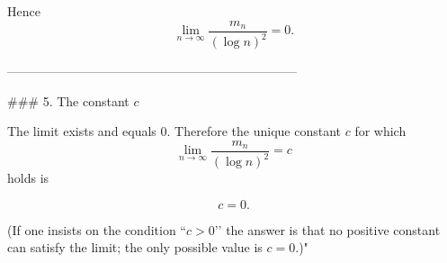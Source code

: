 \documentclass[11pt]{article}
\begin{document}
Hence
\[
\lim_{n\to\infty}\frac{m_{n}}{(\log n)^{2}}=0 .
\]

---------------------------------------------------------------------

### 5.  The constant \(c\)

The limit exists and equals \(0\).  Therefore the unique constant \(c\) for which
\[
\lim_{n\to\infty}\frac{m_{n}}{(\log n)^{2}}=c
\]
holds is

\[
\boxed{c=0}.
\]

(If one insists on the condition “\(c>0\)’’ the answer is that no positive
constant can satisfy the limit; the only possible value is \(c=0\).)"
\end{document}
